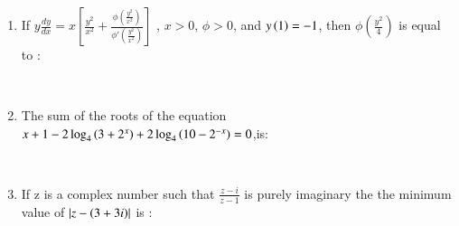\documentclass[journal,12pt,twocolumn]{IEEEtran}
\theoremstyle{remark}
\begin{document}
\begin{enumerate}[start=1]
\item 
If $y\frac{dy}{dx}=x\left[\frac{y^2}{x^2}+\frac{\phi\left(\frac{y^2}{x^2}\right)}{\phi'\left(\frac{y^2}{x^2}\right)}\right]$ , $x>0$, $\phi >0$, and $y\left(1\right)=-1$, then $\phi\left(\frac{y^2}{4}\right)$ is equal to :
\begin{enumerate}
\end{enumerate}
\begin{enumerate}
\end{enumerate}
\\

\item 
The sum of the roots of the equation \\ 
$x+1-2\log_4 \left(3+2^x\right)+2\log_4 \left(10-2^{-x}\right)=0$,is:
\begin{enumerate}
\end{enumerate}
\begin{enumerate}
\end{enumerate}
\\

\item 
If z is a complex number such that $\frac{z-i}{z-1}$ is purely imaginary the the minimum value of $\left| z-\left(3+3i\right)\right|$ is :
\begin{enumerate}
\end{enumerate}
\begin{enumerate}
\end{enumerate}
\\


\end{enumerate}
\end{document}

